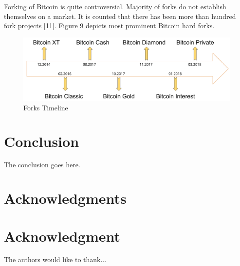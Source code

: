 \documentclass[conference,compsoc]{IEEEtran}
\begin{document}
Forking of Bitcoin is quite controversial. 
Majority of forks do not establish themselves on a market. 
It is counted that there has been more than hundred fork projects [11].
Figure 9 depicts most prominent Bitcoin hard forks. 

\begin{figure}[h]
  \centering
  \includegraphics[width=.45\textwidth]{graphics/timeline.png}
  \caption{Forks Timeline}
  \label{fig:fig9}
\end{figure}



\section{Conclusion}
The conclusion goes here.







\ifCLASSOPTIONcompsoc
  \section*{Acknowledgments}
\else
  \section*{Acknowledgment}
\fi


The authors would like to thank...






\end{document}
